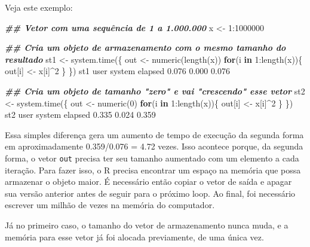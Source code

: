 \documentclass[
  10pt,
  a4paper]{book}
\newenvironment{Shaded}{\begin{snugshade}}{\end{snugshade}}
\newcommand{\ControlFlowTok}[1]{\textcolor[rgb]{0.13,0.29,0.53}{\textbf{#1}}}
\newcommand{\DecValTok}[1]{\textcolor[rgb]{0.00,0.00,0.81}{#1}}
\newcommand{\DocumentationTok}[1]{\textcolor[rgb]{0.56,0.35,0.01}{\textbf{\textit{#1}}}}
\newcommand{\FloatTok}[1]{\textcolor[rgb]{0.00,0.00,0.81}{#1}}
\newcommand{\FunctionTok}[1]{\textcolor[rgb]{0.00,0.00,0.00}{#1}}
\newcommand{\NormalTok}[1]{#1}
\newcommand{\OtherTok}[1]{\textcolor[rgb]{0.56,0.35,0.01}{#1}}
\newcommand{\SpecialCharTok}[1]{\textcolor[rgb]{0.00,0.00,0.00}{#1}}
\begin{document}
Veja este exemplo:

\begin{Shaded}
\begin{Highlighting}[]
\DocumentationTok{\#\# Vetor com uma sequência de 1 a 1.000.000}
\NormalTok{x }\OtherTok{\textless{}{-}} \DecValTok{1}\SpecialCharTok{:}\DecValTok{1000000}

\DocumentationTok{\#\# Cria um objeto de armazenamento com o mesmo tamanho do resultado}
\NormalTok{st1 }\OtherTok{\textless{}{-}} \FunctionTok{system.time}\NormalTok{(\{}
\NormalTok{    out }\OtherTok{\textless{}{-}} \FunctionTok{numeric}\NormalTok{(}\FunctionTok{length}\NormalTok{(x))}
    \ControlFlowTok{for}\NormalTok{(i }\ControlFlowTok{in} \DecValTok{1}\SpecialCharTok{:}\FunctionTok{length}\NormalTok{(x))\{}
\NormalTok{        out[i] }\OtherTok{\textless{}{-}}\NormalTok{ x[i]}\SpecialCharTok{\^{}}\DecValTok{2}
\NormalTok{    \}}
\NormalTok{\})}
\NormalTok{st1}
\NormalTok{   user  system elapsed }
  \FloatTok{0.076}   \FloatTok{0.000}   \FloatTok{0.076} 

\DocumentationTok{\#\# Cria um objeto de tamanho "zero" e vai "crescendo" esse vetor}
\NormalTok{st2 }\OtherTok{\textless{}{-}} \FunctionTok{system.time}\NormalTok{(\{}
\NormalTok{    out }\OtherTok{\textless{}{-}} \FunctionTok{numeric}\NormalTok{(}\DecValTok{0}\NormalTok{)}
    \ControlFlowTok{for}\NormalTok{(i }\ControlFlowTok{in} \DecValTok{1}\SpecialCharTok{:}\FunctionTok{length}\NormalTok{(x))\{}
\NormalTok{        out[i] }\OtherTok{\textless{}{-}}\NormalTok{ x[i]}\SpecialCharTok{\^{}}\DecValTok{2}
\NormalTok{    \}}
\NormalTok{\})}
\NormalTok{st2}
\NormalTok{   user  system elapsed }
  \FloatTok{0.335}   \FloatTok{0.024}   \FloatTok{0.359} 
\end{Highlighting}
\end{Shaded}

Essa simples diferença gera um aumento de tempo de execução da segunda
forma em aproximadamente
0.359/0.076 = 4.72 vezes. Isso acontece
porque, da segunda forma, o vetor \texttt{out} precisa ter seu tamanho
aumentado com um elemento a cada iteração. Para fazer isso, o R precisa
encontrar um espaço na memória que possa armazenar o objeto maior. É
necessário então copiar o vetor de saída e apagar sua versão anterior
antes de seguir para o próximo loop. Ao final, foi necessário escrever
um milhão de vezes na memória do computador.

Já no primeiro caso, o tamanho do vetor de armazenamento nunca muda, e a
memória para esse vetor já foi alocada previamente, de uma única vez.
\end{document}
